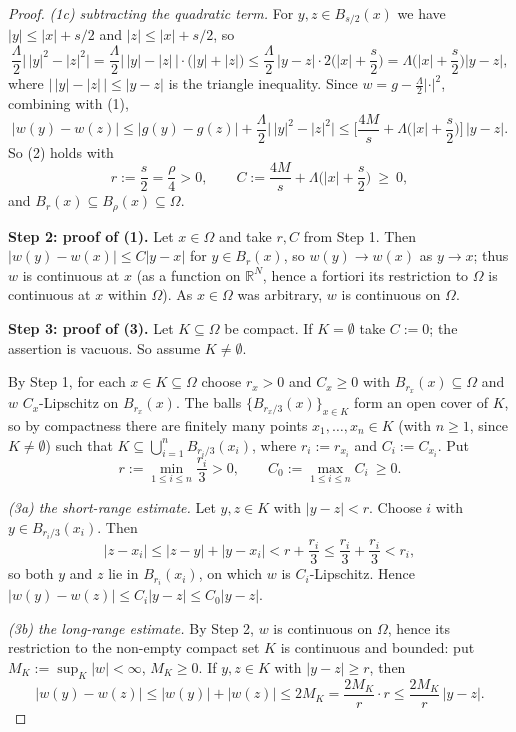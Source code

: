 \begin{proof}
\emph{(1c) subtracting the quadratic term.} For $y,z\in B_{s/2}(x)$ we have
$|y|\le|x|+s/2$ and $|z|\le|x|+s/2$, so
\[
 \frac{\Lambda}{2}\big|\,|y|^{2}-|z|^{2}\big|
  =\frac{\Lambda}{2}\big|\,|y|-|z|\,\big|\cdot\big(|y|+|z|\big)
  \le\frac{\Lambda}{2}\,|y-z|\cdot 2\Big(|x|+\frac{s}{2}\Big)
  =\Lambda\Big(|x|+\frac{s}{2}\Big)|y-z| ,
\]
where $\big|\,|y|-|z|\,\big|\le|y-z|$ is the triangle inequality. Since
$w=g-\tfrac{\Lambda}{2}|\cdot|^{2}$, combining with (1),
\[
 |w(y)-w(z)|\le|g(y)-g(z)|+\frac{\Lambda}{2}\big|\,|y|^{2}-|z|^{2}\big|
  \le\Big[\frac{4M}{s}+\Lambda\Big(|x|+\frac{s}{2}\Big)\Big]\,|y-z| .
\]
So (2) holds with
\[
 r:=\frac{s}{2}=\frac{\rho}{4}>0,\qquad
 C:=\frac{4M}{s}+\Lambda\Big(|x|+\frac{s}{2}\Big)\ \ge\ 0 ,
\]
and $B_r(x)\subseteq B_\rho(x)\subseteq\Omega$.

\medskip\noindent\textbf{Step 2: proof of (1).} Let $x\in\Omega$ and take $r,C$ from Step 1.
Then $|w(y)-w(x)|\le C|y-x|$ for $y\in B_r(x)$, so $w(y)\to w(x)$ as $y\to x$; thus $w$ is
continuous at $x$ (as a function on $\mathbb R^{N}$, hence a fortiori its restriction to
$\Omega$ is continuous at $x$ within $\Omega$). As $x\in\Omega$ was arbitrary, $w$ is
continuous on $\Omega$.

\medskip\noindent\textbf{Step 3: proof of (3).} Let $K\subseteq\Omega$ be compact. If
$K=\emptyset$ take $C:=0$; the assertion is vacuous. So assume $K\ne\emptyset$.

By Step 1, for each $x\in K\subseteq\Omega$ choose $r_x>0$ and $C_x\ge0$ with
$B_{r_x}(x)\subseteq\Omega$ and $w$ $C_x$-Lipschitz on $B_{r_x}(x)$. The balls
$\{B_{r_x/3}(x)\}_{x\in K}$ form an open cover of $K$, so by compactness there are finitely
many points $x_1,\ldots,x_n\in K$ (with $n\ge1$, since $K\ne\emptyset$) such that
$K\subseteq\bigcup_{i=1}^{n}B_{r_i/3}(x_i)$, where $r_i:=r_{x_i}$ and $C_i:=C_{x_i}$. Put
\[
 r:=\min_{1\le i\le n}\frac{r_i}{3}>0,\qquad C_0:=\max_{1\le i\le n}C_i\ \ge0 .
\]

\emph{(3a) the short-range estimate.} Let $y,z\in K$ with $|y-z|<r$. Choose $i$ with
$y\in B_{r_i/3}(x_i)$. Then
\[
 |z-x_i|\le|z-y|+|y-x_i|<r+\frac{r_i}{3}\le\frac{r_i}{3}+\frac{r_i}{3}<r_i ,
\]
so both $y$ and $z$ lie in $B_{r_i}(x_i)$, on which $w$ is $C_i$-Lipschitz. Hence
$|w(y)-w(z)|\le C_i|y-z|\le C_0|y-z|$.

\emph{(3b) the long-range estimate.} By Step 2, $w$ is continuous on $\Omega$, hence its
restriction to the non-empty compact set $K$ is continuous and bounded: put
$M_K:=\sup_{K}|w|<\infty$, $M_K\ge0$. If $y,z\in K$ with $|y-z|\ge r$, then
\[
 |w(y)-w(z)|\le|w(y)|+|w(z)|\le 2M_K=\frac{2M_K}{r}\cdot r\le\frac{2M_K}{r}\,|y-z| .
\]


\end{proof}
